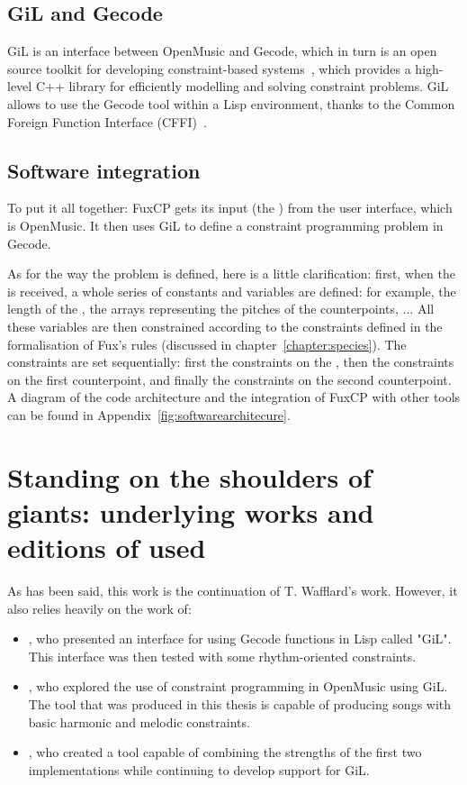 \subsection{GiL and Gecode}
GiL is an interface between OpenMusic and Gecode, which in turn is an open source toolkit for developing constraint-based systems~\cite{Gecode}, which provides a high-level C++ library for efficiently modelling and solving constraint problems. GiL allows to use the Gecode tool within a Lisp environment, thanks to the Common Foreign Function Interface (CFFI)~\cite{CFFI}.

\subsection{Software integration}
To put it all together: FuxCP gets its input (the \cf) from the user interface, which is OpenMusic. It then uses GiL to define a constraint programming problem in Gecode.

As for the way the problem is defined, here is a little clarification: first, when the \cfs is received, a whole series of constants and variables are defined: for example, the length of the \cf, the arrays representing the pitches of the counterpoints, ...
All these variables are then constrained according to the constraints defined in the formalisation of Fux's rules (discussed in chapter~\ref{chapter:species}). The constraints are set sequentially: first the constraints on the \cf, then the constraints on the first counterpoint, and finally the constraints on the second counterpoint. A diagram of the code architecture and the integration of FuxCP with other tools can be found in Appendix~\ref{fig:softwarearchitecure}.



\section{Standing on the shoulders of giants: underlying works and editions of \gaps used}
As has been said, this work is the continuation of T. Wafflard's work. However, it also relies heavily on the work of:
\begin{itemize}
    \item \textcite{GiLthesis}, who presented an interface for using Gecode functions in Lisp called "GiL". This interface was then tested with some rhythm-oriented constraints.
    \item \textcite{Melothesis}, who explored the use of constraint programming in OpenMusic using GiL. The tool that was produced in this thesis is capable of producing songs with basic harmonic and melodic constraints.
    \item \textcite{Melo2thesis}, who created a tool capable of combining the strengths of the first two implementations while continuing to develop support for GiL.
\end{itemize}

